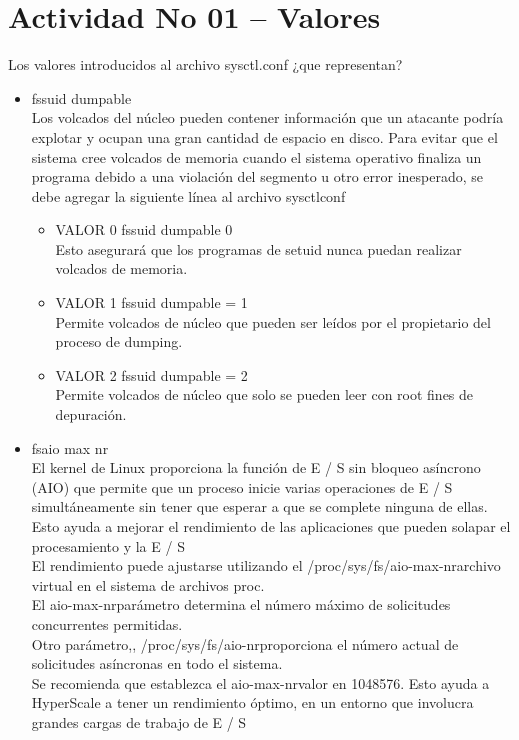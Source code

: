\section{Actividad No 01 – Valores} 

Los valores introducidos al archivo sysctl.conf ¿que representan?

\begin{itemize}
	\item fssuid dumpable
	\\Los volcados del núcleo pueden contener información que un atacante podría explotar y ocupan una gran cantidad de espacio en disco. Para evitar que el 			sistema cree volcados de memoria cuando el sistema operativo finaliza un programa debido a una violación del segmento u otro error inesperado, se debe 			agregar la siguiente línea al archivo sysctlconf
	\begin{itemize}
			\item VALOR 0  	fssuid dumpable  0
			\\Esto asegurará que los programas de setuid nunca puedan realizar volcados de memoria.
			\item VALOR 1  	fssuid dumpable = 1
			\\Permite volcados de núcleo que pueden ser leídos por el propietario del proceso de dumping.
			\item VALOR 2	 fssuid dumpable = 2	
			\\Permite volcados de núcleo que solo se pueden leer con root fines de depuración.
		\end{itemize}

	\item fsaio max nr
	\\El kernel de Linux proporciona la función de E / S sin bloqueo asíncrono (AIO) que permite que un proceso inicie varias operaciones de E / S 					simultáneamente sin tener que esperar a que se complete ninguna de ellas. Esto ayuda a mejorar el rendimiento de las aplicaciones que pueden solapar el 			procesamiento y la E / S
	\\El rendimiento puede ajustarse utilizando el /proc/sys/fs/aio-max-nrarchivo virtual en el sistema de archivos proc. 
	\\El aio-max-nrparámetro determina el número máximo de solicitudes concurrentes permitidas.
	\\Otro parámetro,, /proc/sys/fs/aio-nrproporciona el número actual de solicitudes asíncronas en todo el sistema.
	\\Se recomienda que establezca el aio-max-nrvalor en 1048576. Esto ayuda a HyperScale a tener un rendimiento óptimo, en un entorno que involucra grandes cargas de trabajo de E / S

\end{itemize} 